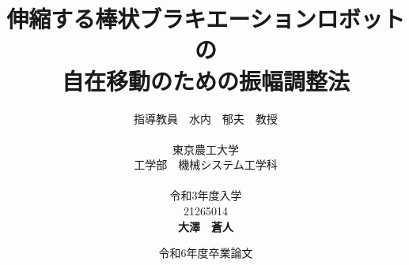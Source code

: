 


\usepackage{ikuo}%


\usepackage[dvipdfmx]{hyperref}  %
\setcounter{topnumber}{4}  %
\usepackage{pxjahyper} %
\usepackage[hang,small,bf]{caption}%
\hypersetup{colorlinks=true}
\hypersetup{linkcolor=black}
\hypersetup{urlcolor=black}
\hypersetup{citecolor=black}

\usepackage{url} %

\newcommand{\FIGDIR}{./fig}        %


\date{令和6年度卒業論文}
\title{伸縮する棒状ブラキエーションロボットの\\自在移動のための振幅調整法}
\author{指導教員　水内　郁夫　教授 \\
\ \\
東京農工大学　\\
工学部　機械システム工学科　\\
\ \\
令和3年度入学\\
21265014\\
{\bf 大澤　蒼人}}


\setlength{\baselineskip}{20pt}
\maketitle
\tableofcontents








% 
% 
% 







